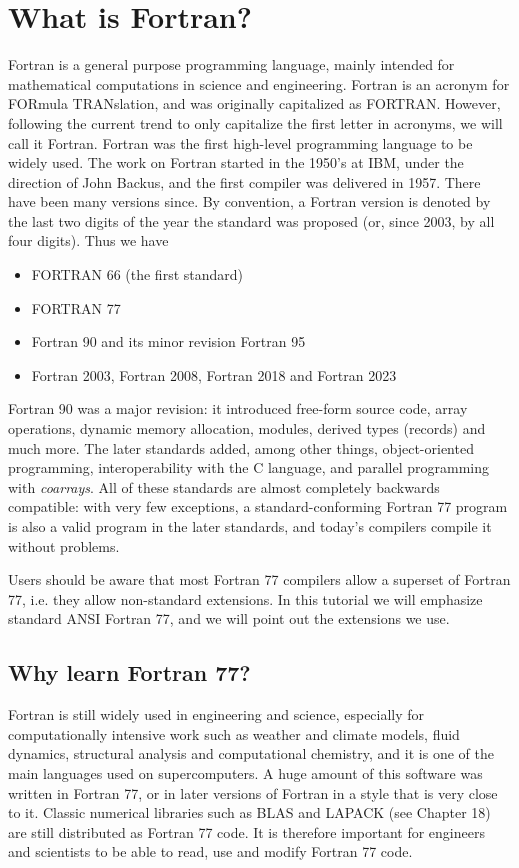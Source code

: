\chapter{What is Fortran?}

Fortran is a general purpose programming language, mainly intended for mathematical computations in science and engineering. Fortran is an acronym for FORmula TRANslation, and was originally capitalized as FORTRAN. However, following the current trend to only capitalize the first letter in acronyms, we will call it Fortran. Fortran was the first high-level programming language to be widely used. The work on Fortran started in the 1950's at IBM, under the direction of John Backus, and the first compiler was delivered in 1957. There have been many versions since. By convention, a Fortran version is denoted by the last two digits of the year the standard was proposed (or, since 2003, by all four digits). Thus we have

\begin{itemize}
    \item FORTRAN 66 (the first standard)
    \item FORTRAN 77
    \item Fortran 90 and its minor revision Fortran 95
    \item Fortran 2003, Fortran 2008, Fortran 2018 and Fortran 2023
\end{itemize}

Fortran 90 was a major revision: it introduced free-form source code, array operations, dynamic memory allocation, modules, derived types (records) and much more. The later standards added, among other things, object-oriented programming, interoperability with the C language, and parallel programming with \emph{coarrays}. All of these standards are almost completely backwards compatible: with very few exceptions, a standard-conforming Fortran 77 program is also a valid program in the later standards, and today's compilers compile it without problems.

Users should be aware that most Fortran 77 compilers allow a superset of Fortran 77, i.e. they allow non-standard extensions. In this tutorial we will emphasize standard ANSI Fortran 77, and we will point out the extensions we use.

\section{Why learn Fortran 77?}

Fortran is still widely used in engineering and science, especially for computationally intensive work such as weather and climate models, fluid dynamics, structural analysis and computational chemistry, and it is one of the main languages used on supercomputers. A huge amount of this software was written in Fortran 77, or in later versions of Fortran in a style that is very close to it. Classic numerical libraries such as BLAS and LAPACK (see Chapter 18) are still distributed as Fortran 77 code. It is therefore important for engineers and scientists to be able to read, use and modify Fortran 77 code.

